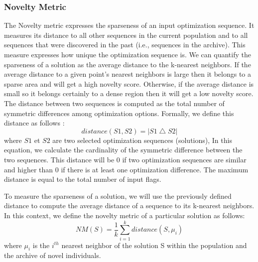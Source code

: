\subsubsection{Novelty Metric}
The Novelty metric expresses the sparseness of an input optimization sequence. It measures its distance to all other sequences in the current population and to all sequences that were discovered in the past (i.e., sequences in the archive).
This measure expresses how unique the optimization sequence is. We can
quantify the sparseness of a solution as the average
distance to the k-nearest neighbors. If the average distance to
a given point's nearest neighbors is large then it belongs to
a sparse area and will get a high novelty score. Otherwise,
if the average distance is small so it belongs certainly to
a dense region then it will get a low novelty score. The distance between two sequences is computed as the total number of symmetric differences among optimization options. Formally, we define this distance as follows :
\begin{equation}
distance(S1,S2)=\left | S1 \bigtriangleup S2 \right |
\end{equation}
where $S1$ et $S2$ are two selected optimization sequences (solutions), In this equation, we calculate the cardinality of the symmetric difference between the two sequences. This distance will be 0 if two optimization sequences are similar and higher than 0 if there is at least one optimization difference. The maximum distance is equal to the total number of input flags.

To measure the sparseness of a solution, we will use the previously defined distance to compute the average distance of a sequence to its k-nearest neighbors. In this context, we define the novelty metric of a particular solution as follows:
\begin{equation}
NM(S) = \frac{1}{k} \sum_{i=1}^{k} distance(S,\mu _{i})
\end{equation}
where $\mu _{i}$ is the $i^{th}$ nearest neighbor of the solution S within the population and the archive of novel individuals.